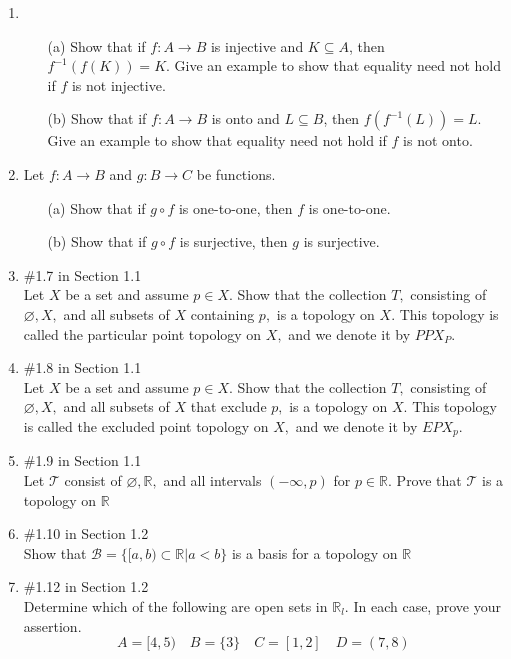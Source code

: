 \documentclass[12pt]{article}
\begin{document}
\begin{enumerate}
    \item 
    \begin{itemize}
        \item[(a)] Show that if $f : A \to B$ is injective and $K \subseteq A$, then $f^{-1}(f(K))=K$. Give an example to show that equality need not hold if $f$ is not injective.
        \item[(b)]  Show that if $f : A \to B$ is onto and $L \subseteq B$, then $f(f^{-1}(L))=L$. Give an example to show that equality need not hold if $f$ is not onto.
    \end{itemize}
        
    \item Let $f : A \to B$ and $g : B \to C$ be functions.
    \begin{itemize}
        \item[(a)] Show that if $g \circ f$ is one-to-one, then $f$ is one-to-one.
        \item[(b)] Show that if $g \circ f$ is surjective, then $g$ is surjective.
    \end{itemize}

\item \#1.7 in Section 1.1\\
Let $X$ be a set and assume $p \in X .$ Show that the collection $T,$ consisting of
$\varnothing, X,$ and all subsets of $X$ containing $p,$ is a topology on $X .$ This topology is called the particular point topology on $X,$ and we denote it by $P P X_{P} .$
\item \#1.8 in Section 1.1\\
Let $X$ be a set and assume $p \in X .$ Show that the collection $T,$ consisting of
$\varnothing, X,$ and all subsets of $X$ that exclude $p,$ is a topology on $X .$ This topology is called the excluded point topology on $X,$ and we denote it by $E P X_{p}$.
\item \#1.9 in Section 1.1\\
Let $\mathcal{T}$ consist of $\varnothing, \mathbb{R},$ and all intervals $(-\infty, p)$ for $p \in \mathbb{R} .$ Prove that $\mathcal{T}$ is a topology on $\mathbb{R}$
\item \#1.10 in Section 1.2\\
Show that $\mathcal{B}=\{[a, b) \subset \mathbb{R} | a<b\}$ is a basis for a topology on $\mathbb{R}$
\item \#1.12 in Section 1.2\\
Determine which of the following are open sets in $\mathbb{R}_{l} .$ In each case, prove your assertion.
$$
A=[4,5) \quad B=\{3\} \quad C=[1,2] \quad D=(7,8)
$$


\end{enumerate}
\end{document}
